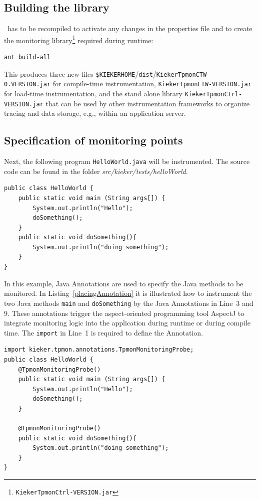 \documentclass[a4paper,12pt]{scrartcl}
\begin{document}
\subsection{Building the \tpmon{} library}

\tpmon\ has to be recompiled to activate any changes in the properties file and to create the monitoring library\footnote{\texttt{KiekerTpmonCtrl-VERSION.jar}} required during runtime:
\begin{lstlisting}[]
ant build-all
\end{lstlisting}
This produces three new files \texttt{\$KIEKERHOME}/\texttt{dist}/\texttt{KiekerTpmonCTW-0.VERSION.jar} for compile-time instrumentation, \texttt{KiekerTpmonLTW-VERSION.jar} for load-time instrumentation, and the stand alone library \texttt{KiekerTpmonCtrl-VERSION.jar} that can be used by other instrumentation frameworks to organize tracing and data storage, e.g., within an application server.

\subsection{Specification of monitoring points}\label{sec.tutorial.annotation}
Next, the following program \texttt{HelloWorld.java} will be instrumented. The source code can be found in the folder \textit{src/kieker/tests/helloWorld}.
\begin{lstlisting}[caption={\texttt{HelloWorld.java}},label={lst1}]
public class HelloWorld {
	public static void main (String args[]) {
		System.out.println("Hello");
		doSomething();
	}
	public static void doSomething(){
		System.out.println("doing something");
	}
}
\end{lstlisting}

In this example, Java Annotations are used to specify the Java methods to be monitored. In Listing~\ref{placingAnnotation} it is illustrated how to instrument the two Java methods \texttt{main} and \texttt{doSomething} by the Java Annotations in Line~3 and 9. These annotations trigger the aspect-oriented programming tool AspectJ to integrate monitoring logic into the application during runtime or during compile time. The \texttt{import} in Line~1 is required to define the Annotation.

\begin{lstlisting}[caption={Lines 1, 3 and 9 are added to instrument this simple ``Hello World'' Java program.},label={placingAnnotation}]
import kieker.tpmon.annotations.TpmonMonitoringProbe;
public class HelloWorld {
	@TpmonMonitoringProbe()
	public static void main (String args[]) {
		System.out.println("Hello");
		doSomething();
	}

	@TpmonMonitoringProbe()
	public static void doSomething(){
		System.out.println("doing something");
	}
}
\end{lstlisting}
\end{document}
